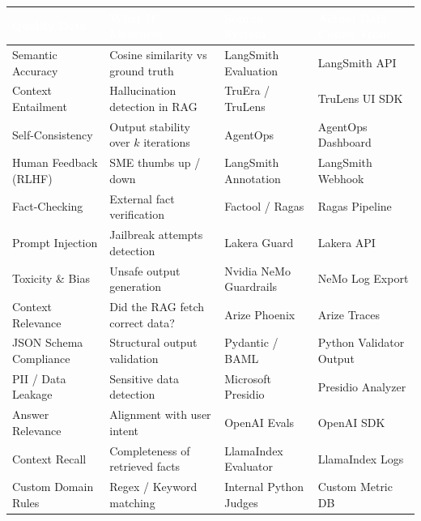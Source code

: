 \documentclass[11pt,a4paper]{article}
\begin{document}
\vspace{0.5cm}
\begin{table}[H]
\centering
\renewcommand{\arraystretch}{1.4}
\begin{tabularx}{\textwidth}{| >{\raggedright\arraybackslash}X >{\raggedright\arraybackslash}X >{\raggedright\arraybackslash}p{3.5cm} >{\raggedright\arraybackslash}X |}
\hline
\rowcolor{dpiblue} \textcolor{white}{\textbf{Quality Data}} & \textcolor{white}{\textbf{What It Measures}} & \textcolor{white}{\textbf{Source System}} & \textcolor{white}{\textbf{Actual Data Comes From}} \\
\hline
Semantic Accuracy & Cosine similarity vs ground truth & LangSmith Evaluation & LangSmith API \\
Context Entailment & Hallucination detection in RAG & TruEra / TruLens & TruLens UI SDK \\
Self-Consistency & Output stability over $k$ iterations & AgentOps & AgentOps Dashboard \\
Human Feedback (RLHF) & SME thumbs up / down & LangSmith Annotation & LangSmith Webhook \\
Fact-Checking & External fact verification & Factool / Ragas & Ragas Pipeline \\
Prompt Injection & Jailbreak attempts detection & Lakera Guard & Lakera API \\
Toxicity \& Bias & Unsafe output generation & Nvidia NeMo Guardrails & NeMo Log Export \\
Context Relevance & Did the RAG fetch correct data? & Arize Phoenix & Arize Traces \\
JSON Schema Compliance & Structural output validation & Pydantic / BAML & Python Validator Output \\
PII / Data Leakage & Sensitive data detection & Microsoft Presidio & Presidio Analyzer \\
Answer Relevance & Alignment with user intent & OpenAI Evals & OpenAI SDK \\
Context Recall & Completeness of retrieved facts & LlamaIndex Evaluator & LlamaIndex Logs \\
Custom Domain Rules & Regex / Keyword matching & Internal Python Judges & Custom Metric DB \\
\hline
\end{tabularx}
\end{table}
\vspace{0.5cm}

\end{document}
